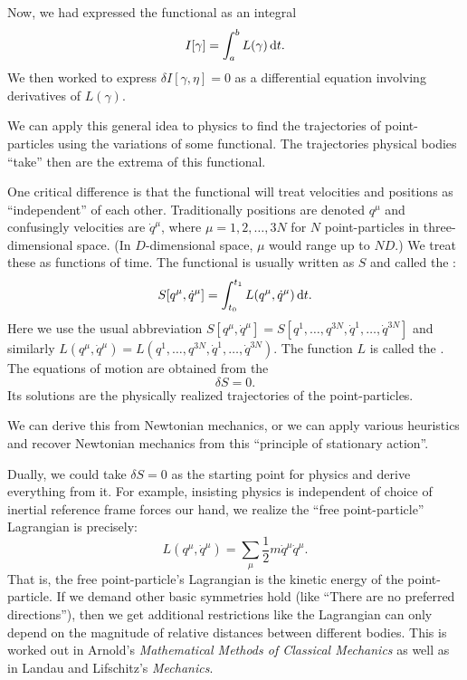 Now, we had expressed the functional as an integral
\begin{equation}
I[\gamma] = \int^{b}_{a}L(\gamma)\,\mathrm{d} t.
\end{equation}
We then worked to express $\delta I[\gamma,\eta]=0$ as a differential
equation involving derivatives of $L(\gamma)$.

We can apply this general idea to physics to find the trajectories of
point-particles using the variations of some functional. The
trajectories physical bodies ``take'' then are the extrema of this
functional.

One critical difference is that the functional will treat velocities and
positions as ``independent'' of each other. Traditionally positions are
denoted $q^{\mu}$ and confusingly velocities are $\dot{q}^{\mu}$, where
$\mu=1,2,\dots,3N$ for $N$ point-particles in three-dimensional
space. (In $D$-dimensional space, $\mu$ would range up to $ND$.) We
treat these as functions of time. The
functional is usually written as $S$ and called the :
\begin{equation}
S[q^{\mu},\dot{q}^{\mu}] =
\int^{t_{1}}_{t_{0}}L(q^{\mu},\dot{q}^{\mu})\,\mathrm{d} t.
\end{equation}
Here we use the usual abbreviation $S[q^{\mu},\dot{q}^{\mu}] = S[q^{1},\dots,q^{3N},\dot{q}^{1},\dots,\dot{q}^{3N}]$
and similarly $L(q^{\mu},\dot{q}^{\mu}) = L(q^{1},\dots,q^{3N},\dot{q}^{1},\dots,\dot{q}^{3N})$.
The function $L$ is called the . The equations of
motion are obtained from the 
\begin{equation}
\delta S = 0.
\end{equation}
Its solutions are the physically realized trajectories of the point-particles.

We can derive this from Newtonian mechanics, or we can apply various
heuristics and recover Newtonian mechanics from this ``principle of
stationary action''.

\M
Dually, we could take $\delta S=0$ as the starting point for physics and
derive everything from it. For example, insisting physics is independent
of choice of inertial reference frame forces our hand, we realize the
``free point-particle'' Lagrangian is precisely:
\begin{equation}
L(q^{\mu},\dot{q}^{\mu}) = \sum_{\mu}\frac{1}{2}m\dot{q}^{\mu}\dot{q}^{\mu}.
\end{equation}
That is, the free point-particle's Lagrangian is the kinetic energy of
the point-particle. If we demand other basic symmetries hold (like
``There are no preferred directions''), then we get additional
restrictions like the Lagrangian can only depend on the magnitude of
relative distances between different bodies. This is worked out in
Arnold's \textit{Mathematical Methods of Classical Mechanics} as well as
in Landau and Lifschitz's \textit{Mechanics}.